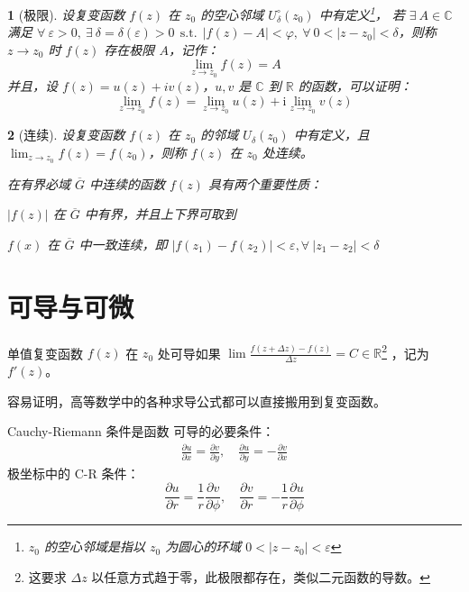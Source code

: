 \documentclass[UTF8]{report}
\def\R{\mathbb{R}}
\def\C{\mathbb{C}}
\theoremstyle{MyLineTheoremStyle} %
\theoremstyle{MyBlockTheoremStyle} %
\theoremstyle{MySubsubsectionStyle} %
\newtheorem{definition}{}
\begin{document}
\begin{definition}[极限]
设复变函数 $f(z)$ 在 $z_0$ 的空心邻域 $U^\circ_{\delta}(z_0)$ 中有定义\footnote{$z_0$ 的空心邻域是指以 $z_0$ 为圆心的环域 $0 < | z - z_0 | < \varepsilon$}，
若 $\exists\ A \in \C $ 满足 $ \forall\ \varepsilon > 0,\ \exists\ \delta = \delta(\varepsilon)>0 \ \ \text{s.t.}\ \ | f(z) - A |<\varphi,\ \forall\ 0<| z - z_0 |<\delta $，则称 $z \to z_0$ 时 $f(z)$ 存在极限 $A$，记作：
\begin{equation}
\lim_{z \to z_0}f(z) = A
\end{equation} 
并且，设 $f(z) = u(z) + iv(z)$，$u,v$ 是 $\C$ 到 $\R$ 的函数，可以证明：
\begin{equation}
\lim_{z \to z_0}f(z) = \lim_{z \to z_0}u(z) + \mathrm{i}  \lim_{z \to z_0}v(z)
\end{equation} 
\end{definition}


\begin{definition}[连续]
设复变函数 $f(z)$ 在 $z_0$ 的邻域 $U_{\delta}(z_0)$ 中有定义，且 $ \lim_{z\to z_0}f(z) = f(z_0)$，则称 $f(z)$ 在 $z_0$ 处连续。

在有界必域 $\overline{G}$ 中连续的函数 $f(z)$ 具有两个重要性质：
\begin{circledenum}[leftmargin=4em]
\item  $ | f(z) | $ 在 $\overline{G}$ 中有界，并且上下界可取到
\item $f(x)$ 在 $\overline{G}$ 中一致连续，即 $| f(z_1) - f(z_2) | < \varepsilon, \forall\ | z_1 - z_2 | < \delta $
\end{circledenum}
\end{definition}


\section{可导与可微}



单值复变函数 $f(z)$ 在 $z_0$ 处可导如果 $\lim\frac{f(z + \Delta z) - f(z)}{\Delta z} = C \in \R$\footnote{这要求 $\Delta z$ 以任意方式趋于零，此极限都存在，类似二元函数的导数。}
，记为 $f'(z)$。


容易证明，高等数学中的各种求导公式都可以直接搬用到复变函数。

Cauchy-Riemann 条件是函数{\color{red} 可导的必要条件}：
\begin{gather}
\boxed{
    \frac{\partial u }{\partial x } = \frac{\partial v }{\partial y },\quad
    \frac{\partial u }{\partial y } = - \frac{\partial v }{\partial x }
}
\end{gather}
极坐标中的 C-R 条件：
\begin{equation}
\boxed{
    \frac{\partial u }{\partial r } = \frac{1}{r}\frac{\partial v }{\partial \phi },\quad \frac{\partial v }{\partial r } = - \frac{1}{r}\frac{\partial u }{\partial \phi }
}
\end{equation}
\end{document}
